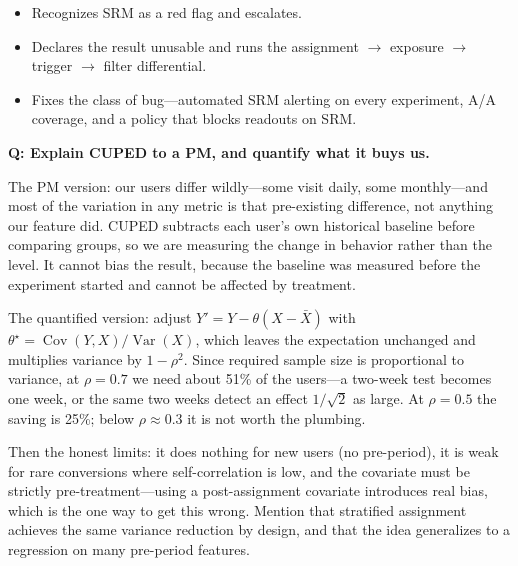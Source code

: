 \begin{interviewq}
\goodgreat
\begin{itemize}
    \item {} Recognizes SRM as a red flag and escalates.
    \item {} Declares the result unusable and runs the assignment $\to$ exposure $\to$ trigger $\to$ filter differential.
    \item {} Fixes the class of bug---automated SRM alerting on every experiment, A/A coverage, and a policy that blocks readouts on SRM.
\end{itemize}

\end{interviewq}

\begin{interviewq}
\textbf{Q: Explain CUPED to a PM, and quantify what it buys us.}

 \quad {} \quad \badgefreq{\freqmed}

\stronganswer

The PM version: our users differ wildly---some visit daily, some monthly---and most of the variation in any metric is that pre-existing difference, not anything our feature did. CUPED subtracts each user's own historical baseline before comparing groups, so we are measuring the change in behavior rather than the level. It cannot bias the result, because the baseline was measured before the experiment started and cannot be affected by treatment.

The quantified version: adjust $Y' = Y - \theta(X - \bar X)$ with $\theta^\star = \operatorname{Cov}(Y,X)/\operatorname{Var}(X)$, which leaves the expectation unchanged and multiplies variance by $1 - \rho^2$. Since required sample size is proportional to variance, at $\rho = 0.7$ we need about 51\% of the users---a two-week test becomes one week, or the same two weeks detect an effect $1/\sqrt{2}$ as large. At $\rho = 0.5$ the saving is 25\%; below $\rho \approx 0.3$ it is not worth the plumbing.

Then the honest limits: it does nothing for new users (no pre-period), it is weak for rare conversions where self-correlation is low, and the covariate must be strictly pre-treatment---using a post-assignment covariate introduces real bias, which is the one way to get this wrong. Mention that stratified assignment achieves the same variance reduction by design, and that the idea generalizes to a regression on many pre-period features.


\end{interviewq}
